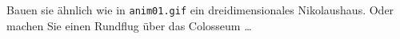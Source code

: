 %
Bauen sie ähnlich wie in \texttt{anim01.gif} ein dreidimensionales
Nikolaushaus. Oder machen Sie einen Rundflug über das Colosseum …
